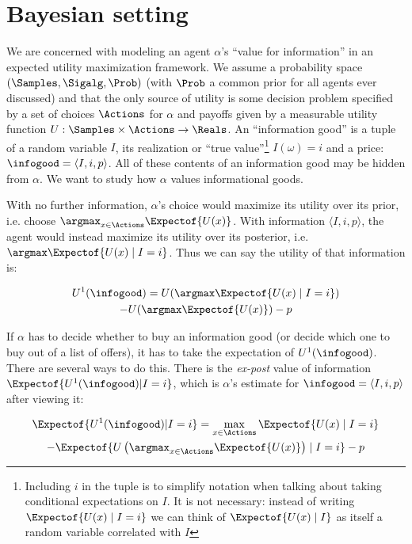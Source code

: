 \section{Bayesian setting}
\label{infonomy:sec:bayes}


We are concerned with modeling an agent $\alpha$'s ``value for information'' in an expected utility maximization framework. We assume a probability space $(\Samples,\Sigalg,\Prob)$ (with $\Prob$ a common prior for all agents ever discussed) and that the only source of utility is some decision problem specified by a set of choices $\Actions$ for $\alpha$ and payoffs given by a measurable utility function $U:\Samples\times\Actions\to\Reals$. An ``information good'' is a tuple of a random variable $I$, its realization or ``true value''\footnote{Including $i$ in the tuple is to simplify notation when talking about taking conditional expectations on $I$. It is not necessary: instead of writing $\Expectof{U(x)\mid I=i}$ we can think of $\Expectof{U(x)\mid I}$ as itself a random variable correlated with $I$} $I(\omega)=i$ and a price: $\infogood=\langle I, i, p\rangle$. All of these contents of an information good may be hidden from $\alpha$. We want to study how $\alpha$ values informational goods.

With no further information, $\alpha$'s choice would maximize its utility over its prior, i.e. choose $\argmax_{x\in\Actions}\Expectof{U(x)}$. With information $\langle I, i, p\rangle$, the agent would instead maximize its utility over its posterior, i.e. $\argmax\Expectof{U(x)\mid I=i}$. Thus we can say the utility of that information is:

\begin{multline}
  U^1(\infogood)=U(\argmax\Expectof{U(x)\mid I=i}) \\
  - U(\argmax\Expectof{U(x)}) - p
  \label{infonomy:eq:voi-true}
\end{multline}

If $\alpha$ has to decide whether to buy an information good (or decide which one to buy out of a list of offers), it has to take the expectation of $U^1(\infogood)$. There are several ways to do this. There is the \emph{ex-post} value of information $\Expectof{U^1(\infogood)|I=i}$, which is $\alpha$'s estimate for $\infogood=\langle I,i,p\rangle$ after viewing it:

\begin{multline}
\Expectof{U^1(\infogood)|I=i}=\max_{x\in\Actions}\Expectof{U(x)\mid I=i} \\
- \Expectof{U\left(\argmax_{x\in\Actions}\Expectof{U(x)}\right)\mid I=i} - p
\label{infonomy:eq:voi-ex-post}
\end{multline}

